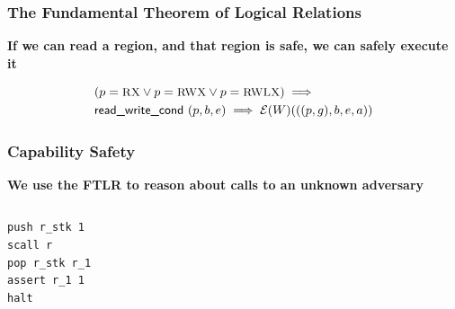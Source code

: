 \documentclass{beamer}
\newcommand{\interp}[2]{(#1)(#2)}
\begin{document}

\begin{frame}
\frametitle{The Fundamental Theorem of Logical Relations}
\begin{center}
\textbf{If we can read a region, and that region is safe, we can safely execute it}
\end{center}
	
	
\begin{align*}
	&(p = \textsc{\small RX} \vee p = \textsc{\small RWX} \vee p = \textsc{\small RWLX}) \implies\\
	&\textsf{read\_write\_cond }(p,b,e) \implies \mathcal{E}\interp{W}{((p,g),b,e,a)}
\end{align*}
\end{frame}


\begin{frame}[fragile]
\frametitle{Capability Safety}
\textbf{We use the FTLR to reason about calls to an unknown adversary}
\\[1cm]
\begin{columns}[c]


\begin{center}
\begin{lstlisting}
push r_stk 1
scall r 
pop r_stk r_1
assert r_1 1
halt
\end{lstlisting}
\end{center}


\end{columns}
\end{frame}
\end{document}
